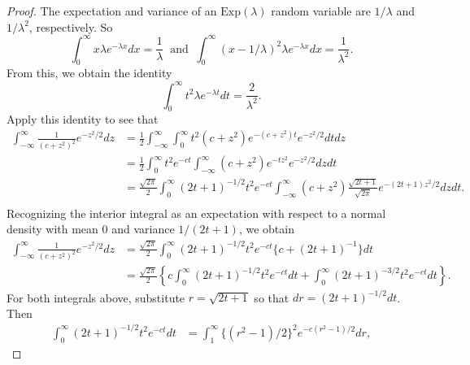 \documentclass[12pt]{article}
\begin{document}
\begin{proof}
The expectation and variance of an $\mathrm{Exp}(\lambda)$ random variable are $1/\lambda$ and $1/\lambda^2$, respectively. So
\begin{equation*}
    \int_{0}^\infty x \lambda e^{-\lambda x} dx = \frac{1}{\lambda}~\text{ and }~\int_{0}^\infty (x-1/\lambda)^2 \lambda e^{-\lambda x} dx = \frac{1}{\lambda^2}.
\end{equation*}
From this, we obtain the identity
\begin{equation*}
    \int_{0}^\infty t^2 \lambda e^{-\lambda t} dt = \frac{2}{\lambda^2} .
\end{equation*}
Apply this identity to see that 
\begin{equation*}
    \begin{aligned}
        \int_{-\infty}^\infty \frac{1}{(c + z^2)^{2}}e^{-z^2/2} dz &= \frac{1}{2} \int_{-\infty}^\infty \int_0^\infty t^2 (c+z^2)e^{-(c+z^2)t} e^{-z^2/2} dt dz \\ 
        &= \frac{1}{2} \int_0^\infty t^2 e^{-ct} \int_{-\infty}^\infty (c+z^2)e^{-t z^2} e^{-z^2/2} dz dt \\
        &= \frac{\sqrt{2\pi}}{2} \int_0^\infty (2t+1)^{-1/2}t^2 e^{-ct} \int_{-\infty}^\infty (c+z^2)\frac{\sqrt{2t+1}}{\sqrt{2\pi}} e^{-(2t+1)z^2/2} dz dt .\\
    \end{aligned}
\end{equation*}
Recognizing the interior integral as an expectation with respect to a normal density with mean $0$ and variance $1/(2t+1)$, we obtain
\begin{equation*}
    \begin{aligned}
        \int_{-\infty}^\infty \frac{1}{(c + z^2)^{2}}e^{-z^2/2} dz &= \frac{\sqrt{2\pi}}{2} \int_0^\infty (2t+1)^{-1/2}t^2 e^{-ct} \{c + (2t+1)^{-1}\} dt \\
        &= \frac{\sqrt{2\pi}}{2} \left\{ c\int_0^\infty (2t+1)^{-1/2}t^2 e^{-ct} dt + \int_0^\infty (2t+1)^{-3/2}t^2 e^{-ct} dt\right\}.
    \end{aligned}
\end{equation*}
For both integrals above, substitute $r = \sqrt{2t+1}$ so that $dr = (2t+1)^{-1/2} dt$. Then
\begin{equation*}
\begin{aligned}
    \int_0^\infty (2t+1)^{-1/2}t^2 e^{-ct} dt &= \int_1^\infty \{(r^2-1)/2\}^2 e^{-c (r^2-1)/2} dr, 
\end{aligned}
\end{equation*}

\end{proof}
\end{document}
